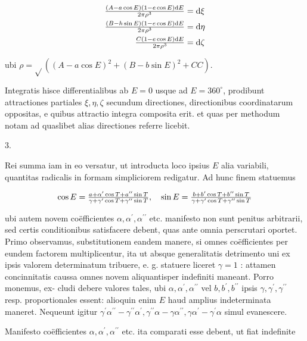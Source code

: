 \documentclass[twoside,12pt, showframe]{memoir}
\let\oldfrac\frac
\def\frac#1#2{\mathchoice{\tfrac{#1}{#2}}{\oldfrac{#1}{#2}}{\genfrac{}{}{}{2}{#1}{#2\mathstrut}}{\genfrac{}{}{}{3}{#1}{#2\mathstrut}}}
\begin{document}
\[
\begin{aligned}
\frac{(A-a \cos E)(1-e \cos E) \mathrm{d} E}{2 \pi \rho^{3}} & =\mathrm{d} \xi \\
\frac{(B-h \sin E)(1-e \cos E) \mathrm{d} E}{2 \pi \rho^{3}} & =\mathrm{d} \eta \\
\frac{C(1-e \cos E) \mathrm{d} E}{2 \pi \rho^{3}} & =\mathrm{d} \zeta
\end{aligned}
\]

ubi \(\rho=\sqrt{ }\left((A-a \cos E)^{2}+(B-b \sin E)^{2}+C C\right)\).

Integratis hisce differentialibus ab \(E=0\) usque ad \(E=360^{\circ}\), prodibunt attractiones partiales \(\xi, \eta, \zeta\) secundum directiones, directionibus coordinatarum oppositas, e quibus attractio integra composita erit. et quas per methodum notam ad quaslibet alias directiones referre licebit.

3.

Rei summa iam in eo versatur, ut introducta loco ipsius \(E\) alia variabili, quantitas radicalis in formam simpliciorem redigatur. Ad hunc finem statuemus

\[
\cos E=\frac{a+\alpha^{\prime} \cos T+a^{\prime \prime} \sin T}{\gamma+\gamma^{\prime} \cos T+\gamma^{\prime \prime} \sin T}, \quad \sin E=\frac{b+b^{\prime} \cos T+b^{\prime \prime} \sin T}{\gamma+\gamma^{\prime} \cos T+\gamma^{\prime \prime} \sin T}
\]

ubi autem novem coëfficientes \(\alpha, \alpha^{\prime}, \alpha^{\prime \prime}\) etc. manifesto non sunt penitus arbitrarii, sed certis conditionibus satisfacere debent, quas ante omnia perscrutari oportet. Primo observamus, substitutionem eandem manere, si omnes coëfficientes per eundem factorem multiplicentur, ita ut absque generalitatis detrimento uni ex ipsis valorem determinatum tribuere, e. g. statuere liceret \(\gamma=1\) : attamen concinnitatis caussa omnes novem aliquantisper indefiniti maneant. Porro monemus, ex-
cludi debere valores tales, ubi \(\alpha, \alpha^{\prime}, \alpha^{\prime \prime}\) vel \(b, b^{\prime}, b^{\prime \prime}\) ipsis \(\gamma, \gamma^{\prime}, \gamma^{\prime \prime}\) resp. proportionales essent: alioquin enim \(E\) haud amplius indeterminata maneret. Nequeunt igitur \(\gamma^{\prime} \alpha^{\prime \prime}-\gamma^{\prime \prime} \alpha^{\prime}, \gamma^{\prime \prime} \alpha-\gamma \alpha^{\prime \prime}, \gamma \alpha^{\prime}-\gamma^{\prime} \alpha\) simul evanescere.

Manifesto coëfficientes \(\alpha, \alpha^{\prime}, \alpha^{\prime \prime}\) etc. ita comparati esse debent, ut fiat indefinite
\end{document}
